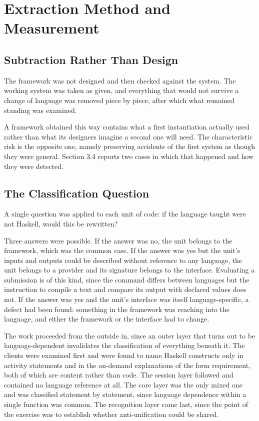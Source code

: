 \documentclass[10pt,twocolumn,letterpaper]{article}
\begin{document}
\section{Extraction Method and Measurement}
\subsection{Subtraction Rather Than Design}
The framework was not designed and then checked against the system. The
working system was taken as given, and everything that would not survive
a change of language was removed piece by piece, after which what
remained standing was examined.

A framework obtained this way contains what a first instantiation
actually used rather than what its designers imagine a second one will
need. The characteristic risk is the opposite one, namely preserving
accidents of the first system as though they were general. Section 3.4
reports two cases in which that happened and how they were detected.

\subsection{The Classification Question}
A single question was applied to each unit of code: if the language
taught were not Haskell, would this be rewritten?

Three answers were possible. If the answer was no, the unit belongs to
the framework, which was the common case. If the answer was yes but the
unit's inputs and outputs could be described without reference to any
language, the unit belongs to a provider and its signature belongs to
the interface. Evaluating a submission is of this kind, since the
command differs between languages but the instruction to compile a text
and compare its output with declared values does not. If the answer was
yes and the unit's interface was itself language-specific, a defect had
been found: something in the framework was reaching into the language,
and either the framework or the interface had to change.

The work proceeded from the outside in, since an outer layer that turns
out to be language-dependent invalidates the classification of
everything beneath it. The clients were examined first and were found to
name Haskell constructs only in activity statements and in the on-demand
explanations of the form requirement, both of which are content rather
than code. The session layer followed and contained no language
reference at all. The core layer was the only mixed one and was
classified statement by statement, since language dependence within a
single function was common. The recognition layer came last, since the
point of the exercise was to establish whether anti-unification could be
shared.
\end{document}
